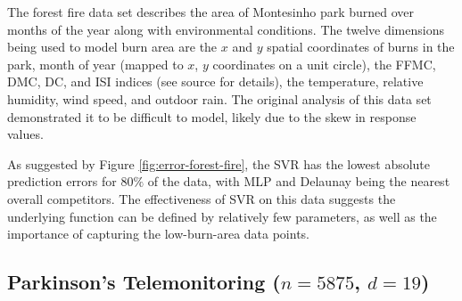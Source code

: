 The forest fire data set \cite{cortez2007data} describes the area of
Montesinho park burned over months of the year along with
environmental conditions. The twelve dimensions being used to model
burn area are the $x$ and $y$ spatial coordinates of burns in the
park, month of year (mapped to $x$, $y$ coordinates on a unit circle),
the FFMC, DMC, DC, and ISI indices (see source for details), the
temperature, relative humidity, wind speed, and outdoor rain. The
original analysis of this data set demonstrated it to be difficult to
model, likely due to the skew in response values.

As suggested by Figure \ref{fig:error-forest-fire}, the SVR has the
lowest absolute prediction errors for $80\%$ of the data, with MLP and
Delaunay being the nearest overall competitors. The effectiveness of
SVR on this data suggests the underlying function can be defined by
relatively few parameters, as well as the importance of capturing the
low-burn-area data points.



\subsection{Parkinson's Telemonitoring ($n = 5875$, $d = 19$)}

